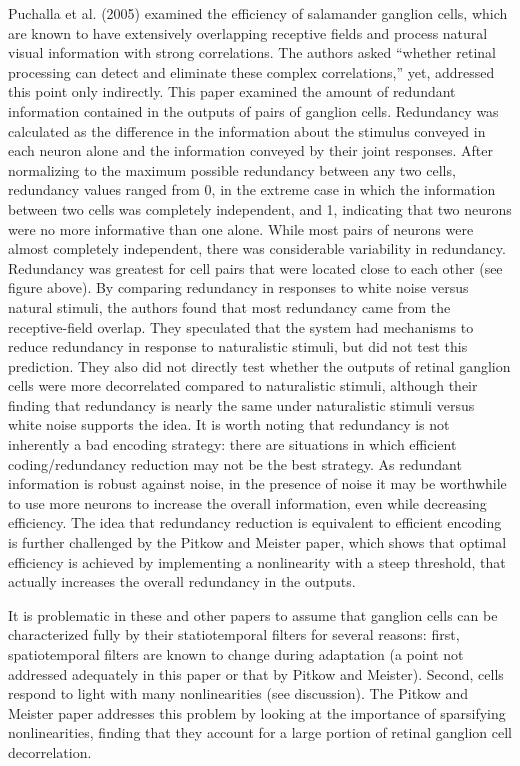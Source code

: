 \documentclass[12pt]{article}
\begin{document}
Puchalla et al. (2005) examined the efficiency of salamander ganglion cells, which are known to have extensively overlapping receptive fields and process natural visual information with strong correlations. The authors asked “whether retinal processing can detect and eliminate these complex correlations,” yet, addressed this point only indirectly. This paper examined the amount of redundant information contained in the outputs of pairs of ganglion cells. Redundancy was calculated as the difference in the information about the stimulus conveyed in each neuron alone and the information conveyed by their joint responses. After normalizing to the maximum possible redundancy between any two cells, redundancy values ranged from 0, in the extreme case in which the information between two cells was completely independent, and 1, indicating that two neurons were no more informative than one alone. While most pairs of neurons were almost completely independent, there was considerable variability in redundancy. Redundancy was greatest for cell pairs that were located close to each other (see figure above). By comparing redundancy in responses to white noise versus natural stimuli, the authors found that most redundancy came from the receptive-field overlap. They speculated that the system had mechanisms to reduce redundancy in response to naturalistic stimuli, but did not test this prediction. They also did not directly test whether the outputs of retinal ganglion cells were more decorrelated compared to naturalistic stimuli, although their finding that redundancy is nearly the same under naturalistic stimuli versus white noise supports the idea. It is worth noting that redundancy is not inherently a bad encoding strategy: there are situations in which efficient coding/redundancy reduction may not be the best strategy. As redundant information is robust against noise, in the presence of noise it may be worthwhile to use more neurons to increase the overall information, even while decreasing efficiency. The idea that redundancy reduction is equivalent to efficient encoding is further challenged by the Pitkow and Meister paper, which shows that optimal efficiency is achieved by implementing a nonlinearity with a steep threshold, that actually increases the overall redundancy in the outputs.

It is problematic in these and other papers to assume that ganglion cells can be characterized fully by their statiotemporal filters for several reasons: first, spatiotemporal filters are known to change during adaptation (a point not addressed adequately in this paper or that by Pitkow and Meister). Second, cells respond to light with many nonlinearities (see discussion). The Pitkow and Meister paper addresses this problem by looking at the importance of sparsifying nonlinearities, finding that they account for a large portion of retinal ganglion cell decorrelation. 
\end{document}
